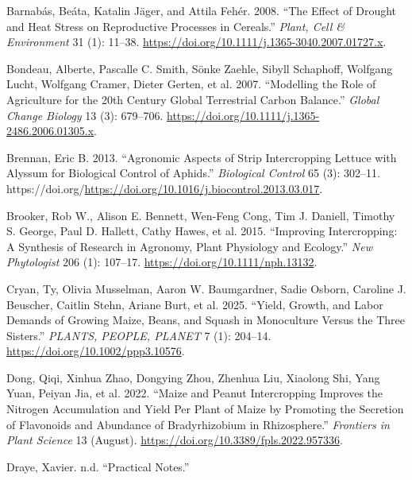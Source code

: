 \documentclass[
]{article}
\newlength{\cslhangindent}
\newenvironment{CSLReferences}[2] %
 {\begin{list}{}{%
  \setlength{\itemindent}{0pt}
  \setlength{\leftmargin}{0pt}
  \setlength{\parsep}{0pt}
  \ifodd #1
   \setlength{\leftmargin}{\cslhangindent}
   \setlength{\itemindent}{-1\cslhangindent}
  \fi
  \setlength{\itemsep}{#2\baselineskip}}}
 {\end{list}}
\begin{document}
\label{refs}
\begin{CSLReferences}{1}{0}
Barnabás, Beáta, Katalin Jäger, and Attila Fehér. 2008. {``The Effect of
Drought and Heat Stress on Reproductive Processes in Cereals.''}
\emph{Plant, Cell \& Environment} 31 (1): 11--38.
\url{https://doi.org/10.1111/j.1365-3040.2007.01727.x}.

Bondeau, Alberte, Pascalle C. Smith, Sönke Zaehle, Sibyll Schaphoff,
Wolfgang Lucht, Wolfgang Cramer, Dieter Gerten, et al. 2007.
{``Modelling the Role of Agriculture for the 20th Century Global
Terrestrial Carbon Balance.''} \emph{Global Change Biology} 13 (3):
679--706. \url{https://doi.org/10.1111/j.1365-2486.2006.01305.x}.

Brennan, Eric B. 2013. {``Agronomic Aspects of Strip Intercropping
Lettuce with Alyssum for Biological Control of Aphids.''}
\emph{Biological Control} 65 (3): 302--11.
https://doi.org/\url{https://doi.org/10.1016/j.biocontrol.2013.03.017}.

Brooker, Rob W., Alison E. Bennett, Wen-Feng Cong, Tim J. Daniell,
Timothy S. George, Paul D. Hallett, Cathy Hawes, et al. 2015.
{``Improving Intercropping: A Synthesis of Research in Agronomy, Plant
Physiology and Ecology.''} \emph{New Phytologist} 206 (1): 107--17.
\url{https://doi.org/10.1111/nph.13132}.

Cryan, Ty, Olivia Musselman, Aaron W. Baumgardner, Sadie Osborn,
Caroline J. Beuscher, Caitlin Stehn, Ariane Burt, et al. 2025. {``Yield,
Growth, and Labor Demands of Growing Maize, Beans, and Squash in
Monoculture Versus the {Three} {Sisters}.''} \emph{PLANTS, PEOPLE,
PLANET} 7 (1): 204--14. \url{https://doi.org/10.1002/ppp3.10576}.

Dong, Qiqi, Xinhua Zhao, Dongying Zhou, Zhenhua Liu, Xiaolong Shi, Yang
Yuan, Peiyan Jia, et al. 2022. {``Maize and Peanut Intercropping
Improves the Nitrogen Accumulation and Yield Per Plant of Maize by
Promoting the Secretion of Flavonoids and Abundance of {Bradyrhizobium}
in Rhizosphere.''} \emph{Frontiers in Plant Science} 13 (August).
\url{https://doi.org/10.3389/fpls.2022.957336}.

Draye, Xavier. n.d. {``Practical Notes.''}


\end{CSLReferences}
\end{document}
